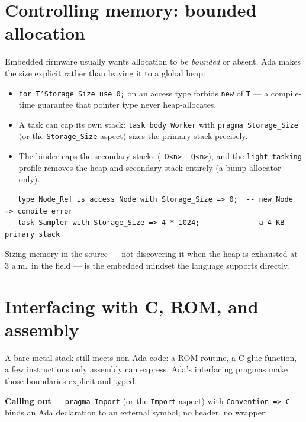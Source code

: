 \section{Controlling memory: bounded allocation}
\label{sec:memory}

Embedded firmware usually wants allocation to be \emph{bounded} or absent. Ada
makes the size explicit rather than leaving it to a global heap:

\begin{itemize}
  \item \texttt{for T'Storage\_Size use 0;} on an access type forbids
        \texttt{new} of \texttt{T} --- a compile-time guarantee that pointer type
        never heap-allocates.
  \item A task can cap its own stack: \texttt{task body Worker} with
        \texttt{pragma Storage\_Size} (or the \texttt{Storage\_Size} aspect) sizes
        the primary stack precisely.
  \item The binder caps the secondary stacks (\texttt{-D<n>}, \texttt{-Q<n>}), and
        the \texttt{light-tasking} profile removes the heap and secondary stack
        entirely (a bump allocator only).
\end{itemize}

\begin{lstlisting}
   type Node_Ref is access Node with Storage_Size => 0;  -- new Node => compile error
   task Sampler with Storage_Size => 4 * 1024;           -- a 4 KB primary stack
\end{lstlisting}

Sizing memory in the source --- not discovering it when the heap is exhausted at
3 a.m.\ in the field --- is the embedded mindset the language supports directly.

\section{Interfacing with C, ROM, and assembly}
\label{sec:interfacing}

A bare-metal stack still meets non-Ada code: a ROM routine, a C glue function, a
few instructions only assembly can express. Ada's interfacing pragmas make those
boundaries explicit and typed.

\textbf{Calling out} --- \texttt{pragma Import} (or the \texttt{Import} aspect)
with \texttt{Convention => C} binds an Ada declaration to an external symbol; no
header, no wrapper:

